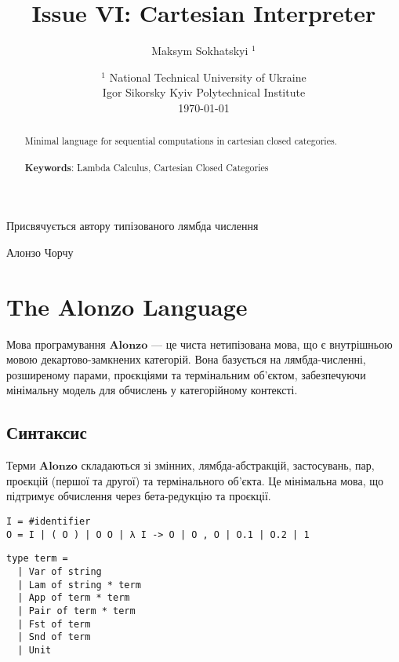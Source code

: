 \documentclass{article}
\begin{document}
\title{Issue VI: Cartesian Interpreter}
\author{Maksym Sokhatskyi $^1$}
\date{ $^1$ National Technical University of Ukraine \\
       \small Igor Sikorsky Kyiv Polytechnical Institute \\
       \today }

\maketitle

\begin{abstract}

Minimal language for sequential computations in cartesian closed categories.
\\
\\
{\bf Keywords}: Lambda Calculus, Cartesian Closed Categories
\end{abstract}

\ifincludeTOC
  \tableofcontents
\fi

\newpage

\epigraph{Присвячується автору типізованого лямбда числення}{Алонзо Чорчу}

\section{The Alonzo Language}

Мова програмування $\mathbf{Alonzo}$ — це чиста нетипізована мова, що є внутрішньою мовою декартово-замкнених категорій. Вона базується на лямбда-численні, розширеному парами, проєкціями та термінальним об’єктом, забезпечуючи мінімальну модель для обчислень у категорійному контексті.

\subsection{Синтаксис}

Терми $\mathbf{Alonzo}$ складаються зі змінних, лямбда-абстракцій, застосувань, пар, проєкцій (першої та другої) та термінального об’єкта. Це мінімальна мова, що підтримує обчислення через бета-редукцію та проєкції.

\begin{lstlisting}[mathescape=true]
I = #identifier
O = I | ( O ) | O O | λ I -> O | O , O | O.1 | O.2 | 1
\end{lstlisting}

\begin{lstlisting}[mathescape=true]
type term =
  | Var of string
  | Lam of string * term
  | App of term * term
  | Pair of term * term
  | Fst of term
  | Snd of term
  | Unit
\end{lstlisting}
\end{document}
